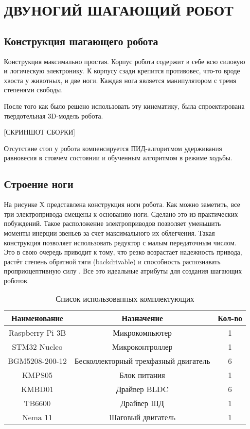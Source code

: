 \chapter{\MakeUppercase{Двуногий шагающий робот}}
\section{Конструкция шагающего робота}
Конструкция максимально простая. Корпус робота содержит в себе всю силовую и логическую электронику. К корпусу сзади крепится противовес, что-то вроде хвоста у животных, и две ноги. Каждая нога является манипулятором с тремя степенями свободы. 

После того как было решено использовать эту кинематику, была спроектирована твердотельная 3D-модель робота.

\begin{center}
    [СКРИНШОТ СБОРКИ]
\end{center}

Отсутствие стоп у робота компенсируется ПИД-алгоритмом удерживания равновесия в стоячем состоянии и обученным алгоритмом в режиме ходьбы.

\section{Строение ноги}

На рисунке X представлена конструкция ноги робота. Как можно заметить, все три электропривода смещены к основанию ноги. Сделано это из практических побуждений. Такое расположение электроприводов позволяет уменьшить моменты инерции звеньев за счет максимального их облегчения. Такая конструкция позволяет использовать редуктор с малым передаточным числом. Это в свою очередь приводит к тому, что резко возрастает надежность привода, растёт степень обратной тяги (backdrivable) и способность распознавать проприоцептивную силу \cite{Seok2012}. Все это идеальные атрибуты для создания шагающих роботов.

\begin{table}[ht]
    \caption{Список использованных комплектующих}
    \label{tab_stuff}
    \centering
    \begin{tabular}{|c|c|c|}
        \hline Наименование     & Назначение        & Кол-во \\
        \hline Raspberry Pi 3B  & Микрокомпьютер    & 1 \\
        \hline STM32 Nucleo     & Микроконтроллер   & 1 \\
        \hline BGM5208-200-12   & Бесколлекторный трехфазный двигатель & 6 \\
        \hline KMPS05           & Блок питания      & 1 \\
        \hline KMBD01           & Драйвер BLDC      & 6 \\
        \hline TB6600           & Драйвер ШД        & 1 \\
        \hline Nema 11          & Шаговый двигатель & 1 \\
        \hline
    \end{tabular}
\end{table}

